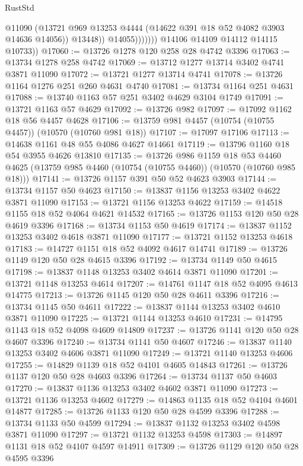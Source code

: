 \begin{lexlean}{RustStd}
\begin{coremodule}
                          @11090
                          (@13721 @969 @13253 @4444 (@14622 @391 @18 @52 @4082 @3903 @14636 @14056))
                          @13448))
                      @14055)))))))
        @14106
        @14109
        @14112
        @14115
        @10733))
@17060 := @13726 @1278 @120 @258 @28 @4742 @3396
@17063 := @13734 @1278 @258 @4742
@17069 := @13712 @1277 @13714 @3402 @4741 @3871 @11090
@17072 := @13721 @1277 @13714 @4741
@17078 := @13726 @1164 @1276 @251 @260 @4631 @4740
@17081 := @13734 @1164 @251 @4631
@17088 := @13740 @1163 @57 @251 @3402 @4629 @3104 @1749
@17091 := @13721 @1163 @57 @4629
@17092 := @13726 @982
@17097 := @17092 @1162 @18 @56 @4457 @4628
@17106 := @13759 @981 @4457 (@10754 (@10755 @4457)) (@10570 (@10760 @981 @18))
@17107 := @17097 @17106
@17113 := @14638 @1161 @48 @55 @4086 @4627 @14661
@17119 := @13796 @1160 @18 @54 @3955 @4626 @13810
@17135 := @13726
    @986
    @1159
    @18
    @53
    @4460
    @4625
    (@13759 @985 @4460 (@10754 (@10755 @4460)) (@10570 (@10760 @985 @18)))
@17141 := @13726 @1157 @391 @50 @52 @4623 @3903
@17144 := @13734 @1157 @50 @4623
@17150 := @13837 @1156 @13253 @3402 @4622 @3871 @11090
@17153 := @13721 @1156 @13253 @4622
@17159 := @14518 @1155 @18 @52 @4064 @4621 @14532
@17165 := @13726 @1153 @120 @50 @28 @4619 @3396
@17168 := @13734 @1153 @50 @4619
@17174 := @13837 @1152 @13253 @3402 @4618 @3871 @11090
@17177 := @13721 @1152 @13253 @4618
@17183 := @14727 @1151 @18 @52 @4092 @4617 @14741
@17189 := @13726 @1149 @120 @50 @28 @4615 @3396
@17192 := @13734 @1149 @50 @4615
@17198 := @13837 @1148 @13253 @3402 @4614 @3871 @11090
@17201 := @13721 @1148 @13253 @4614
@17207 := @14761 @1147 @18 @52 @4095 @4613 @14775
@17213 := @13726 @1145 @120 @50 @28 @4611 @3396
@17216 := @13734 @1145 @50 @4611
@17222 := @13837 @1144 @13253 @3402 @4610 @3871 @11090
@17225 := @13721 @1144 @13253 @4610
@17231 := @14795 @1143 @18 @52 @4098 @4609 @14809
@17237 := @13726 @1141 @120 @50 @28 @4607 @3396
@17240 := @13734 @1141 @50 @4607
@17246 := @13837 @1140 @13253 @3402 @4606 @3871 @11090
@17249 := @13721 @1140 @13253 @4606
@17255 := @14829 @1139 @18 @52 @4101 @4605 @14843
@17261 := @13726 @1137 @120 @50 @28 @4603 @3396
@17264 := @13734 @1137 @50 @4603
@17270 := @13837 @1136 @13253 @3402 @4602 @3871 @11090
@17273 := @13721 @1136 @13253 @4602
@17279 := @14863 @1135 @18 @52 @4104 @4601 @14877
@17285 := @13726 @1133 @120 @50 @28 @4599 @3396
@17288 := @13734 @1133 @50 @4599
@17294 := @13837 @1132 @13253 @3402 @4598 @3871 @11090
@17297 := @13721 @1132 @13253 @4598
@17303 := @14897 @1131 @18 @52 @4107 @4597 @14911
@17309 := @13726 @1129 @120 @50 @28 @4595 @3396

\end{coremodule}
\end{lexlean}
